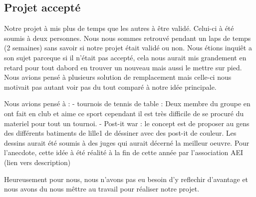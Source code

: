 \subsection{Projet accepté}%
\label{sub:projet_accepte}

Notre projet à mis plus de temps que les autres à être validé.
Celui-ci à été soumis à deux personnes. Nous nous sommes retrouvé
pendant un laps de temps (2 semaines) sans savoir si notre projet était
validé ou non. Nous étions inquiêt a son sujet parceque si il n'était
pas accepté, cela nous aurait mis grandement en retard pour tout dabord
en trouver un nouveau mais aussi le mettre sur pied. Nous avions pensé à
plusieurs solution de remplacement mais celle-ci nous motivait pas
autant voir pas du tout comparé à notre idée principale.

Nous avions pensé à :
  - tournois de tennis de table : Deux membre du groupe en ont fait
en club et aime ce sport cependant il est très difficile de se procuré
du materiel pour tout un tournoi.
  - Post-it war : le concept est de proposer au gens des différents
batiments de lille1 de déssiner avec des post-it de couleur. Les dessins
aurait été soumis à des juges qui aurait décerné la meilleur oeuvre.
Pour l'anecdote, cette idée à été réalité à la fin de cette année par
l'association AEI (lien vers description)

Heureusement pour nous, nous n'avons pas eu besoin d'y reflechir
d'avantage et nous avons du nous mêttre au travail pour réaliser notre
projet.

